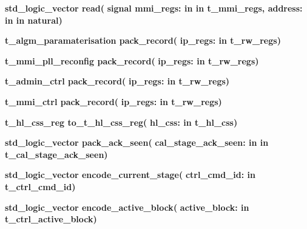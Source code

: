 \begin{DoxyCompactItemize}
{\bfseries {\bfseries \textcolor{comment}{std\+\_\+logic\+\_\+vector}\textcolor{vhdlchar}{ }}} {\bf read}{\bfseries  ( }{\bfseries {\bfseries \textcolor{keywordflow}{signal}\textcolor{vhdlchar}{ }}\textcolor{vhdlchar}{mmi\+\_\+regs\+: }\textcolor{stringliteral}{in }\textcolor{vhdlchar}{in t\+\_\+mmi\+\_\+regs}}{\bfseries  , \textcolor{vhdlchar}{address\+: }\textcolor{stringliteral}{in }\textcolor{vhdlchar}{in natural}}{\bfseries  )} 
\item 
{\bfseries {\bfseries \textcolor{vhdlchar}{t\+\_\+algm\+\_\+paramaterisation}\textcolor{vhdlchar}{ }}} {\bf pack\+\_\+record}{\bfseries  ( }{\bfseries \textcolor{vhdlchar}{ip\+\_\+regs\+: }\textcolor{stringliteral}{in }\textcolor{vhdlchar}{t\+\_\+rw\+\_\+regs}}{\bfseries  )} 
\item 
{\bfseries {\bfseries \textcolor{vhdlchar}{t\+\_\+mmi\+\_\+pll\+\_\+reconfig}\textcolor{vhdlchar}{ }}} {\bf pack\+\_\+record}{\bfseries  ( }{\bfseries \textcolor{vhdlchar}{ip\+\_\+regs\+: }\textcolor{stringliteral}{in }\textcolor{vhdlchar}{t\+\_\+rw\+\_\+regs}}{\bfseries  )} 
\item 
{\bfseries {\bfseries \textcolor{vhdlchar}{t\+\_\+admin\+\_\+ctrl}\textcolor{vhdlchar}{ }}} {\bf pack\+\_\+record}{\bfseries  ( }{\bfseries \textcolor{vhdlchar}{ip\+\_\+regs\+: }\textcolor{stringliteral}{in }\textcolor{vhdlchar}{t\+\_\+rw\+\_\+regs}}{\bfseries  )} 
\item 
{\bfseries {\bfseries \textcolor{vhdlchar}{t\+\_\+mmi\+\_\+ctrl}\textcolor{vhdlchar}{ }}} {\bf pack\+\_\+record}{\bfseries  ( }{\bfseries \textcolor{vhdlchar}{ip\+\_\+regs\+: }\textcolor{stringliteral}{in }\textcolor{vhdlchar}{t\+\_\+rw\+\_\+regs}}{\bfseries  )} 
\item 
{\bfseries {\bfseries \textcolor{vhdlchar}{t\+\_\+hl\+\_\+css\+\_\+reg}\textcolor{vhdlchar}{ }}} {\bf to\+\_\+t\+\_\+hl\+\_\+css\+\_\+reg}{\bfseries  ( }{\bfseries \textcolor{vhdlchar}{hl\+\_\+css\+: }\textcolor{stringliteral}{in }\textcolor{vhdlchar}{t\+\_\+hl\+\_\+css}}{\bfseries  )} 
\item 
{\bfseries {\bfseries \textcolor{comment}{std\+\_\+logic\+\_\+vector}\textcolor{vhdlchar}{ }}} {\bf pack\+\_\+ack\+\_\+seen}{\bfseries  ( }{\bfseries \textcolor{vhdlchar}{cal\+\_\+stage\+\_\+ack\+\_\+seen\+: }\textcolor{stringliteral}{in }\textcolor{vhdlchar}{in t\+\_\+cal\+\_\+stage\+\_\+ack\+\_\+seen}}{\bfseries  )} 
\item 
{\bfseries {\bfseries \textcolor{comment}{std\+\_\+logic\+\_\+vector}\textcolor{vhdlchar}{ }}} {\bf encode\+\_\+current\+\_\+stage}{\bfseries  ( }{\bfseries \textcolor{vhdlchar}{ctrl\+\_\+cmd\+\_\+id\+: }\textcolor{stringliteral}{in }\textcolor{vhdlchar}{t\+\_\+ctrl\+\_\+cmd\+\_\+id}}{\bfseries  )} 
\item 
{\bfseries {\bfseries \textcolor{comment}{std\+\_\+logic\+\_\+vector}\textcolor{vhdlchar}{ }}} {\bf encode\+\_\+active\+\_\+block}{\bfseries  ( }{\bfseries \textcolor{vhdlchar}{active\+\_\+block\+: }\textcolor{stringliteral}{in }\textcolor{vhdlchar}{t\+\_\+ctrl\+\_\+active\+\_\+block}}{\bfseries  )} 
\end{DoxyCompactItemize}
